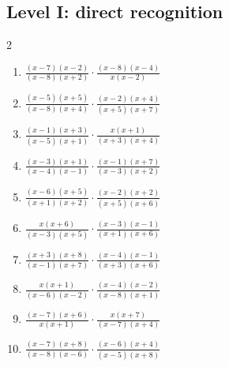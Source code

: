 \documentclass[11pt,oneside]{book}
\begin{document}
\subsection*{Level I: direct recognition}
\begin{multicols}{2}
\begin{enumerate}[leftmargin=*,label=\textbf{\arabic*.},itemsep=0.65\baselineskip]
\item $\displaystyle \frac{\left(x - 7\right) \left(x - 2\right)}{\left(x - 8\right) \left(x + 2\right)}\cdot\frac{\left(x - 8\right) \left(x - 4\right)}{x \left(x - 2\right)}$
\item $\displaystyle \frac{\left(x - 5\right) \left(x + 5\right)}{\left(x - 8\right) \left(x + 4\right)}\cdot\frac{\left(x - 2\right) \left(x + 4\right)}{\left(x + 5\right) \left(x + 7\right)}$
\item $\displaystyle \frac{\left(x - 1\right) \left(x + 3\right)}{\left(x - 5\right) \left(x + 1\right)}\cdot\frac{x \left(x + 1\right)}{\left(x + 3\right) \left(x + 4\right)}$
\item $\displaystyle \frac{\left(x - 3\right) \left(x + 1\right)}{\left(x - 4\right) \left(x - 1\right)}\cdot\frac{\left(x - 1\right) \left(x + 7\right)}{\left(x - 3\right) \left(x + 2\right)}$
\item $\displaystyle \frac{\left(x - 6\right) \left(x + 5\right)}{\left(x + 1\right) \left(x + 2\right)}\cdot\frac{\left(x - 2\right) \left(x + 2\right)}{\left(x + 5\right) \left(x + 6\right)}$
\item $\displaystyle \frac{x \left(x + 6\right)}{\left(x - 3\right) \left(x + 5\right)}\cdot\frac{\left(x - 3\right) \left(x - 1\right)}{\left(x + 1\right) \left(x + 6\right)}$
\item $\displaystyle \frac{\left(x + 3\right) \left(x + 8\right)}{\left(x - 1\right) \left(x + 7\right)}\cdot\frac{\left(x - 4\right) \left(x - 1\right)}{\left(x + 3\right) \left(x + 6\right)}$
\item $\displaystyle \frac{x \left(x + 1\right)}{\left(x - 6\right) \left(x - 2\right)}\cdot\frac{\left(x - 4\right) \left(x - 2\right)}{\left(x - 8\right) \left(x + 1\right)}$
\item $\displaystyle \frac{\left(x - 7\right) \left(x + 6\right)}{x \left(x + 1\right)}\cdot\frac{x \left(x + 7\right)}{\left(x - 7\right) \left(x + 4\right)}$
\item $\displaystyle \frac{\left(x - 7\right) \left(x + 8\right)}{\left(x - 8\right) \left(x - 6\right)}\cdot\frac{\left(x - 6\right) \left(x + 4\right)}{\left(x - 5\right) \left(x + 8\right)}$
\end{enumerate}
\end{multicols}
\end{document}
